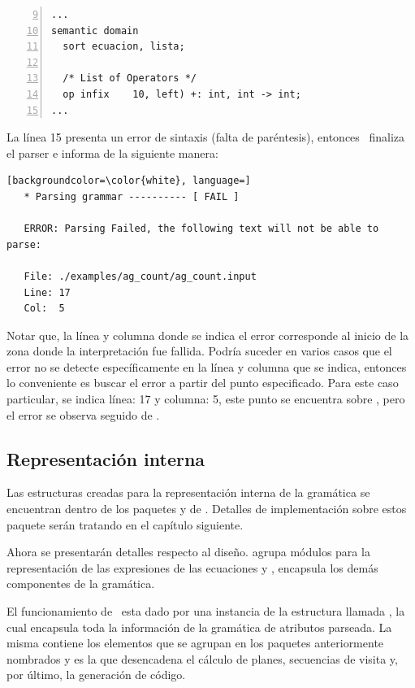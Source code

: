 \begin{lstlisting}[numbers=left, firstnumber=9, language=specmag, linewidth=8cm, columns=fullflexible]
...
semantic domain
  sort ecuacion, lista;

  /* List of Operators */
  op infix    10, left) +: int, int -> int;
...
\end{lstlisting}

La línea 15 presenta un error de sintaxis (falta de paréntesis), entonces \maggen\ finaliza el parser e informa de la siguiente manera:

\begin{lstlisting}[backgroundcolor=\color{white}, language=]
   * Parsing grammar ---------- [ FAIL ]

   ERROR: Parsing Failed, the following text will not be able to parse:

   File: ./examples/ag_count/ag_count.input
   Line: 17
   Col:  5
\end{lstlisting}

Notar que, la línea y columna donde se indica el error corresponde al inicio de la zona donde la interpretación fue fallida. Podría suceder en varios casos que el error no se detecte específicamente en la línea y columna que se indica, entonces lo conveniente es buscar el error a partir del punto especificado. Para este caso particular, se indica línea: 17 y columna: 5, este punto se encuentra sobre , pero el error se observa seguido de .

\subsection{Representación interna}

Las estructuras creadas para la representación interna de la gramática se encuentran dentro de los paquetes  y  de \maggen. Detalles de implementación sobre estos paquete serán tratando en el capítulo siguiente. 

Ahora se presentarán detalles respecto al diseño.
 agrupa módulos para la representación de las expresiones de las ecuaciones y , encapsula los demás componentes de la gramática.

El funcionamiento de \maggen\ esta dado por una instancia de la estructura llamada , la cual encapsula toda la información de la gramática de atributos parseada. La misma contiene los elementos que se agrupan en los paquetes anteriormente nombrados y es la que desencadena el cálculo de planes, secuencias de visita y, por último, la generación de código. 
 
